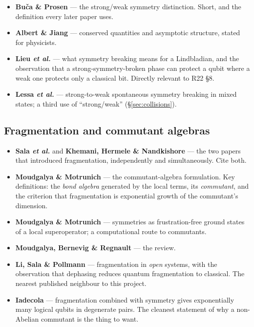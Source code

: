 \documentclass[11pt]{article}
\theoremstyle{plain}
\theoremstyle{remark}
\begin{document}
\begin{itemize}
\item \textbf{Bu\v{c}a \& Prosen} \cite{Buca2012} --- the strong/weak symmetry
distinction. Short, and the definition every later paper uses.
\item \textbf{Albert \& Jiang} \cite{AJ2014} --- conserved quantities and
asymptotic structure, stated for physicists.
\item \textbf{Lieu \emph{et al.}} \cite{Lieu2020} --- what symmetry breaking
means for a Lindbladian, and the observation that a strong-symmetry-broken
phase can protect a qubit where a weak one protects only a classical bit.
Directly relevant to R22 \S8.
\item \textbf{Lessa \emph{et al.}} \cite{Lessa2024} --- strong-to-weak
spontaneous symmetry breaking in mixed states; a third use of ``strong/weak''
(\S\ref{sec:collisions}).
\end{itemize}

\subsection{Fragmentation and commutant algebras}

\begin{itemize}
\item \textbf{Sala \emph{et al.}} \cite{Sala2020} and \textbf{Khemani, Hermele
\& Nandkishore} \cite{Khemani2020} --- the two papers that introduced
fragmentation, independently and simultaneously. Cite both.
\item \textbf{Moudgalya \& Motrunich} \cite{MM2022} --- the commutant-algebra
formulation. Key definitions: the \emph{bond algebra} generated by the local
terms, its \emph{commutant}, and the criterion that fragmentation is
exponential growth of the commutant's dimension.
\item \textbf{Moudgalya \& Motrunich} \cite{MM2024} --- symmetries as
frustration-free ground states of a local superoperator; a computational route
to commutants.
\item \textbf{Moudgalya, Bernevig \& Regnault} \cite{MBR2022} --- the review.
\item \textbf{Li, Sala \& Pollmann} \cite{Li2023} --- fragmentation in
\emph{open} systems, with the observation that dephasing reduces quantum
fragmentation to classical. The nearest published neighbour to this project.
\item \textbf{Iadecola} \cite{Iadecola2026} --- fragmentation combined with
symmetry gives exponentially many logical qubits in degenerate pairs. The
cleanest statement of why a non-Abelian commutant is the thing to want.
\end{itemize}
\end{document}
